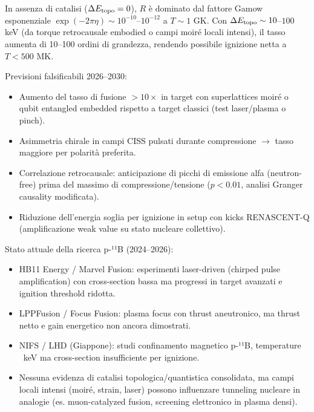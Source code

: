 \documentclass[11pt,a4paper]{article}
\theoremstyle{plain}
\theoremstyle{definition}
\begin{document}
\vspace{0.2cm}

In assenza di catalisi ($\Delta E_{\rm topo} = 0$), $R$ è dominato dal fattore Gamow esponenziale $\exp(-2\pi \eta) \sim 10^{-10}$–$10^{-12}$ a $T \sim 1$ GK. Con $\Delta E_{\rm topo} \sim 10$–$100$ keV (da torque retrocausale embodied o campi moiré locali intensi), il tasso aumenta di 10–100 ordini di grandezza, rendendo possibile ignizione netta a $T < 500$ MK.

\vspace{0.2cm}

Previsioni falsificabili 2026–2030:
\begin{itemize}
    \item Aumento del tasso di fusione $>10\times$ in target con superlattices moiré o qubit entangled embedded rispetto a target classici (test laser/plasma o pinch).
    \item Asimmetria chirale in campi CISS pulsati durante compressione $\to$ tasso maggiore per polarità preferita.
    \item Correlazione retrocausale: anticipazione di picchi di emissione alfa (neutron-free) prima del massimo di compressione/tensione ($p < 0.01$, analisi Granger causality modificata).
    \item Riduzione dell'energia soglia per ignizione in setup con kicks RENASCENT-Q (amplificazione weak value su stato nucleare collettivo).
\end{itemize}

\vspace{0.2cm}

Stato attuale della ricerca p-¹¹B (2024–2026):
\begin{itemize}
    \item HB11 Energy / Marvel Fusion: esperimenti laser-driven (chirped pulse amplification) con cross-section bassa ma progressi in target avanzati e ignition threshold ridotta.
    \item LPPFusion / Focus Fusion: plasma focus con thrust aneutronico, ma thrust netto e gain energetico non ancora dimostrati.
    \item NIFS / LHD (Giappone): studi confinamento magnetico p-¹¹B, temperature ~keV ma cross-section insufficiente per ignizione.
    \item Nessuna evidenza di catalisi topologica/quantistica consolidata, ma campi locali intensi (moiré, strain, laser) possono influenzare tunneling nucleare in analogie (es. muon-catalyzed fusion, screening elettronico in plasma densi).
\end{itemize}
\end{document}
